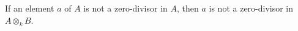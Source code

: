 If an element $a$ of $A$ is not a zero-divisor in $A$, then $a$ is not a zero-divisor in $A \otimes_k B$.
